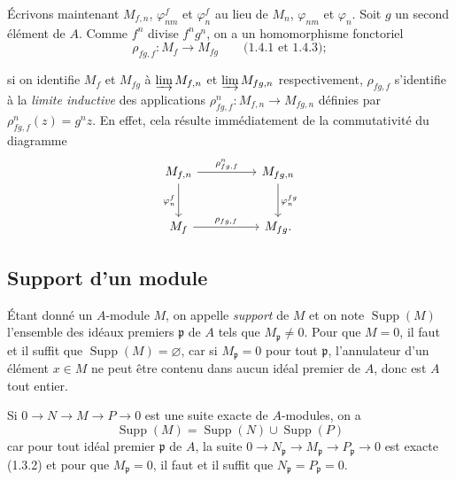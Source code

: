 \begin{env}[1.6.2]
\label{0.1.6.2-fr}
Écrivons maintenant $M_{f,n}$, $\varphi_{nm}^f$ et $\varphi_n^f$ au lieu de
$M_n$, $\varphi_{nm}$ et $\varphi_n$. Soit $g$ un second élément de $A$. Comme
$f^n$ divise $f^ng^n$, on a un homomorphisme fonctoriel
\[
  \rho_{fg,f}:M_f\longrightarrow M_{fg}\qquad\text{(1.4.1 et 1.4.3)};
\]


si on identifie $M_f$ et $M_{fg}$ à $\varinjlim M_{f,n}$ et
$\varinjlim M_{fg,n}$ respectivement, $\rho_{fg,f}$ s'identifie à la
\emph{limite inductive} des applications
$\rho_{fg,f}^n:M_{f,n}\to M_{fg,n}$ définies par
$\rho_{fg,f}^n(z)=g^nz$. En effet, cela résulte immédiatement de la
commutativité du diagramme
\[
\begin{tikzcd}[column sep=huge,row sep=large]
M_{f,n} \arrow[r,"\rho_{fg,f}^n"] \arrow[d,"\varphi_n^f"']
  & M_{fg,n} \arrow[d,"\varphi_n^{fg}"] \\
M_f \arrow[r,"\rho_{fg,f}"]
  & M_{fg}.
\end{tikzcd}
\]
\end{env}

\subsection{Support d'un module}
\label{subsection:0.1.7-fr}

\begin{env}[1.7.1]
\label{0.1.7.1-fr}
Étant donné un $A$-module $M$, on appelle \emph{support} de $M$ et on note
$\operatorname{Supp}(M)$ l'ensemble des idéaux premiers $\mathfrak p$ de $A$
tels que $M_{\mathfrak p}\neq0$. Pour que $M=0$, il faut et il suffit que
$\operatorname{Supp}(M)=\varnothing$, car si $M_{\mathfrak p}=0$ pour tout
$\mathfrak p$, l'annulateur d'un élément $x\in M$ ne peut être contenu dans
aucun idéal premier de $A$, donc est $A$ tout entier.
\end{env}

\begin{env}[1.7.2]
\label{0.1.7.2-fr}
Si $0\to N\to M\to P\to0$ est une suite exacte de $A$-modules, on a
\[
  \operatorname{Supp}(M)=\operatorname{Supp}(N)\cup\operatorname{Supp}(P)
\]
car pour tout idéal premier $\mathfrak p$ de $A$, la suite
$0\to N_{\mathfrak p}\to M_{\mathfrak p}\to P_{\mathfrak p}\to0$ est exacte
(1.3.2) et pour que $M_{\mathfrak p}=0$, il faut et il suffit que
$N_{\mathfrak p}=P_{\mathfrak p}=0$.
\end{env}

